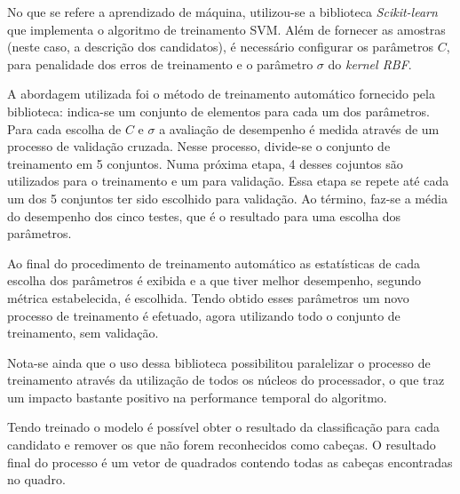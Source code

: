 No que se refere a aprendizado de máquina, utilizou-se a biblioteca \textit{Scikit-learn} \cite{scikit-learn} que implementa o algoritmo de treinamento SVM. Além de fornecer as amostras (neste caso, a descrição dos candidatos), é necessário configurar os parâmetros $C$, para penalidade dos erros de treinamento e o parâmetro $\sigma$ do \textit{kernel RBF}. 

A abordagem utilizada foi o método de treinamento automático fornecido pela biblioteca: indica-se um conjunto de elementos para cada um dos parâmetros. Para cada escolha de $C$ e $\sigma$ a avaliação de desempenho é medida através de um processo de validação cruzada. Nesse processo, divide-se o conjunto de treinamento em 5 conjuntos. Numa próxima etapa, 4 desses cojuntos são utilizados para o treinamento e um para validação. Essa etapa se repete até cada um dos 5 conjuntos ter sido escolhido para validação. Ao término, faz-se a média do desempenho dos cinco testes, que é o resultado para uma escolha dos parâmetros.

Ao final do procedimento de treinamento automático as estatísticas de cada escolha dos parâmetros é exibida e a que tiver melhor desempenho, segundo métrica estabelecida, é escolhida. Tendo obtido esses parâmetros um novo processo de treinamento é efetuado, agora utilizando todo o conjunto de treinamento, sem validação.

Nota-se ainda que o uso dessa biblioteca possibilitou paralelizar o processo de treinamento através da utilização de todos os núcleos do processador, o que traz um impacto bastante positivo na performance temporal do algoritmo.

Tendo treinado o modelo é possível obter o resultado da classificação para cada candidato e remover os que não forem reconhecidos como cabeças. O resultado final do processo é um vetor de quadrados contendo todas as cabeças encontradas no quadro.
